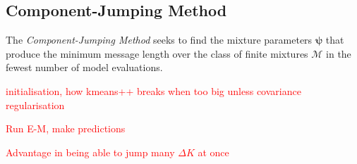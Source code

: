 \documentclass{elsarticle}
\newcommand{\todo}[1]{\textcolor{red}{#1}}
\newcommand{\vect}[1]{\boldsymbol{\mathbf{#1}}}
\renewcommand{\vec}[1]{\vect{#1}}
\begin{document}
\subsection{Component-Jumping Method}

The \emph{Component-Jumping Method} seeks to find the mixture parameters $\vec\psi$ that produce the minimum message length over the class of finite mixtures $\vec{\mathcal{M}}$ in the fewest number of model evaluations.

\todo{initialisation, how kmeans++ breaks when too big unless covariance regularisation\\}

\todo{Run E-M, make predictions\\}

\todo{Advantage in being able to jump many $\Delta{}K$ at once}
\end{document}
